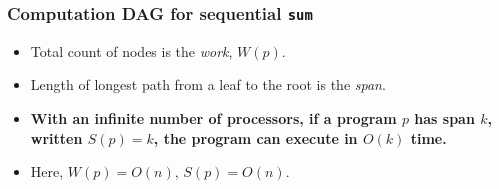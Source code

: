 \begin{frame}
  \frametitle{Computation DAG for sequential \texttt{sum}}

  \begin{center}
  \end{center}

      \begin{itemize}
      \item Total count of nodes is the \textit{work}, $W(p)$.
      \item Length of longest path from a leaf to the root is the
        \textit{span}.
      \item \textbf{With an infinite number of processors, if a program $p$ has
          span $k$, written $S(p) = k$, the program can execute in $O(k)$
          time.}
      \item Here, $W(p) = O(n)$, $S(p) = O(n)$.
     \end{itemize}

\end{frame}

